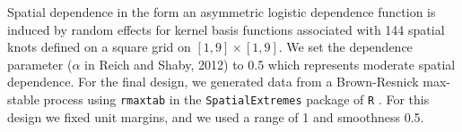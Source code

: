 Spatial dependence in the form an asymmetric logistic dependence function is induced by random effects for kernel basis functions associated with 144 spatial knots defined on a square grid on $[1,9] \times [1,9]$.
We set the dependence parameter ($\alpha$ in Reich and Shaby, 2012) to 0.5 which represents moderate spatial dependence.
For the final design, we generated data from a Brown-Resnick max-stable process  using \texttt{rmaxtab} in the \texttt{SpatialExtremes} package of \texttt{R} \citep{Ribatet2015}.
For this design we fixed unit \Frechet margins, and we used a range of 1 and smoothness 0.5.


